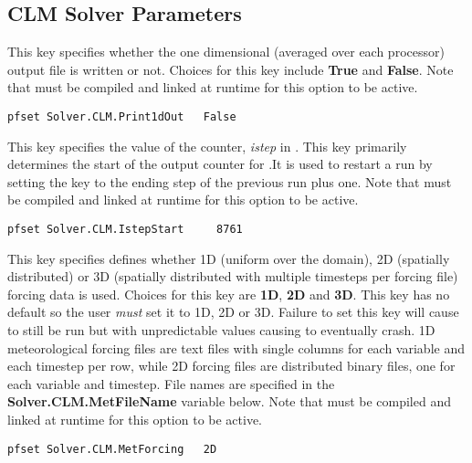 \subsection{CLM Solver Parameters}
\label{CLM Solver Parameters}

{This key specifies whether the  one dimensional (averaged over each processor) output file is written or not.
Choices for this key include {\bf True} and {\bf False}. Note that  must be compiled and linked at runtime for this option to be active.
}
\begin{display}\begin{verbatim}
pfset Solver.CLM.Print1dOut   False
\end{verbatim}\end{display}


{This key specifies the value of the counter, {\em istep} in .  This key primarily determines the start of the output counter for .It is used to restart a run by setting the key to the ending step of the previous run plus one. Note that  must be compiled and linked at runtime for this option to be active.
}
\begin{display}\begin{verbatim}
pfset Solver.CLM.IstepStart     8761
\end{verbatim}\end{display}


{This key specifies defines whether 1D (uniform over
the domain), 2D (spatially distributed) or 3D (spatially distributed with multiple timesteps per  forcing file) forcing data is used.  Choices for this key are {\bf 1D}, {\bf 2D} and {\bf 3D}. This key
has no default so the user {\em must} set it to 1D, 2D or 3D. Failure to set this key will cause  to still be run but with unpredictable values causing  to eventually crash. 1D meteorological forcing files are text files with single columns for each variable and each timestep per row, while 2D forcing files are distributed \parflow{} binary files, one for each variable and timestep.  File names are specified in the {\bf Solver.CLM.MetFileName} variable below. Note that  must be compiled and linked at runtime for this option to be active.
}
\begin{display}\begin{verbatim}
pfset Solver.CLM.MetForcing   2D
\end{verbatim}\end{display}

